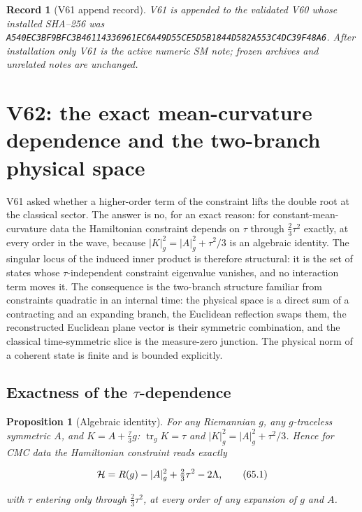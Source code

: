 \documentclass[11pt]{article}
\newtheorem{proposition}[theorem]{Proposition}
\newtheorem{record}[theorem]{Record}
\theoremstyle{remark}
\begin{document}
\begin{record}[V61 append record]
\label{rec:v19v61}
V61 is appended to the validated V60 whose installed SHA--256 was
\texttt{A540EC3BF9BFC3B46114336961EC6A49D55CE5D5B1844D582A553C4DC39F48A6}.
After installation only V61 is the active numeric SM note; frozen
archives and unrelated notes are unchanged.
\end{record}


\section{V62: the exact mean-curvature dependence and the two-branch physical space}
\label{sec:v19v62}

V61 asked whether a higher-order term of the constraint lifts the
double root at the classical sector.  The answer is no, for an exact
reason: for constant-mean-curvature data the Hamiltonian constraint
depends on \(\tau\) through \(\tfrac23\tau^2\) exactly, at every order
in the wave, because \(|K|_g^2=|A|_g^2+\tau^2/3\) is an algebraic
identity.  The singular locus of the induced inner product is
therefore structural: it is the set of states whose \(\tau\)-independent
constraint eigenvalue vanishes, and no interaction term moves it.  The
consequence is the two-branch structure familiar from constraints
quadratic in an internal time: the physical space is a direct sum of a
contracting and an expanding branch, the Euclidean reflection swaps
them, the reconstructed Euclidean plane vector is their symmetric
combination, and the classical time-symmetric slice is the measure-zero
junction.  The physical norm of a coherent state is finite and is
bounded explicitly.

\subsection{Exactness of the \(\tau\)-dependence}

\begin{proposition}[Algebraic identity]
\label{prop:v19v62-exact}
For any Riemannian \(g\), any \(g\)-traceless symmetric \(A\), and
\(K=A+\tfrac\tau3g\): \(\operatorname{tr}_gK=\tau\) and
\(|K|_g^2=|A|_g^2+\tau^2/3\).  Hence for CMC data the Hamiltonian
constraint reads exactly

\[
 {\cal H}=R(g)-|A|_g^2+\tfrac23\tau^2-2\Lambda,                        \tag{65.1}
\]

with \(\tau\) entering only through \(\tfrac23\tau^2\), at every order of
any expansion of \(g\) and \(A\).
\end{proposition}
\end{document}
